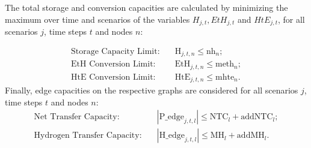 The total storage and conversion capacities are calculated by minimizing the maximum over time and scenarios of the variables $H_{j,t}, EtH_{j,t}$ and $HtE_{j,t}$, for all scenarios \(j\), time steps \(t\) and nodes \(n\):

\begin{align*}
    \text{Storage Capacity Limit:} \quad & \text{H}_{j,t,n} \leq \text{nh}_n ;\\
    \text{EtH Conversion Limit:} \quad & \text{EtH}_{j,t,n} \leq \text{meth}_n;\\
    \text{HtE Conversion Limit:} \quad & \text{HtE}_{j,t,n} \leq \text{mhte}_n .
\end{align*}
Finally, edge capacities on the respective graphs are considered for all scenarios \(j\), time steps \(t\) and nodes \(n\):
\begin{align*}
    \text{Net Transfer Capacity:} \quad & |\text{P\_edge}_{j,t,l}|\le\text{NTC}_l + \text{addNTC}_l ;\\
    \text{Hydrogen Transfer Capacity:} \quad & |\text{H\_edge}_{j,t,l}|\le\text{MH}_l + \text{addMH}_l.
\end{align*}




